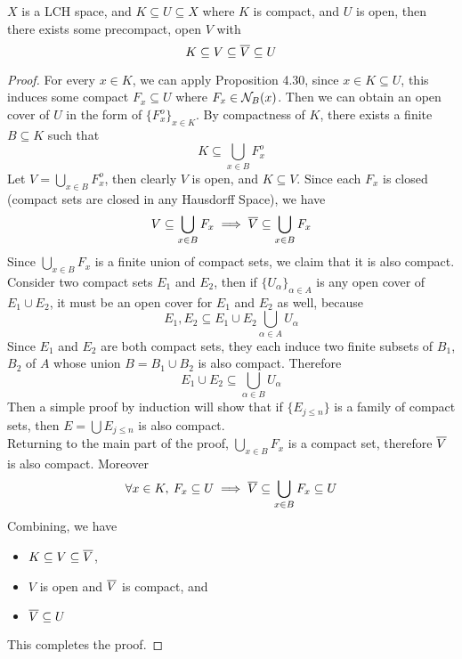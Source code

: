 \documentclass[../../main.tex]{subfiles}
\begin{document}
\begin{wts}
    $X$ is a LCH space, and $K\subseteq U\subseteq X$ where $K$ is compact, and $U$ is open, then there exists some precompact, open $V$ with
    \[
    K\subseteq V\subseteq \overline{V}\subseteq U
    \]
\end{wts}
\begin{proof}
    For every $x\in K$, we can apply Proposition 4.30, since $x\in K\subseteq U$, this induces some compact $F_x\subseteq U$ where $F_x\in\mathcal{N}_B({x})$. Then we can obtain an open cover of $U$ in the form of $\{F_x^o\}_{x\in K}$. By compactness of $K$, there exists a finite $B\subseteq K$ such that 
    \[
    K\subseteq \bigcup_{x\in B} F_x^o
    \]
    Let $V = \bigcup_{x\in B}F_x^o$, then clearly $V$ is open, and $K\subseteq V$. Since each $F_x$ is closed (compact sets are closed in any Hausdorff Space), we have
    \[
    V\subseteq \bigcup_{x\in B}F_x\implies\overline{V}\subseteq\bigcup_{x\in B}F_x
    \]
    Since $\bigcup_{x\in B}F_x$ is a finite union of compact sets, we claim that it is also compact. Consider two compact sets $E_1$ and $E_2$, then if $\{U_\alpha\}_{\alpha\in A}$ is any open cover of $E_1\cup E_2$, it must be an open cover for $E_1$ and $E_2$ as well, because
    \[
    E_1,E_2\subseteq E_1\cup E_2 \bigcup_{\alpha\in A} U_\alpha
    \]
    Since $E_1$ and $E_2$ are both compact sets, they each induce two finite subsets of $B_1$, $B_2$ of $A$ whose union $B = B_1\cup B_2$ is also compact. Therefore
    \[
    E_1\cup E_2 \subseteq \bigcup_{\alpha\in B}U_\alpha
    \]
    Then a simple proof by induction will show that if $\{E_{j\leq n}\}$ is a family of compact sets, then $E = \bigcup E_{j\leq n}$ is also compact.\\
    
    Returning to the main part of the proof, $\bigcup_{x\in B}F_x$ is a compact set, therefore $\overline{V}$ is also compact. Moreover
    \[
    \forall x\in K,\: F_x\subseteq U\implies \overline{V}\subseteq\bigcup_{x\in B}F_x\subseteq U
    \]
    Combining, we have
    \begin{itemize}
        \item $K\subseteq V\subseteq \overline{V}$, 
        \item $V$ is open and $\overline{V}$ is compact, and
        \item $\overline{V}\subseteq U$
    \end{itemize}
    This completes the proof.
\end{proof}
\end{document}

